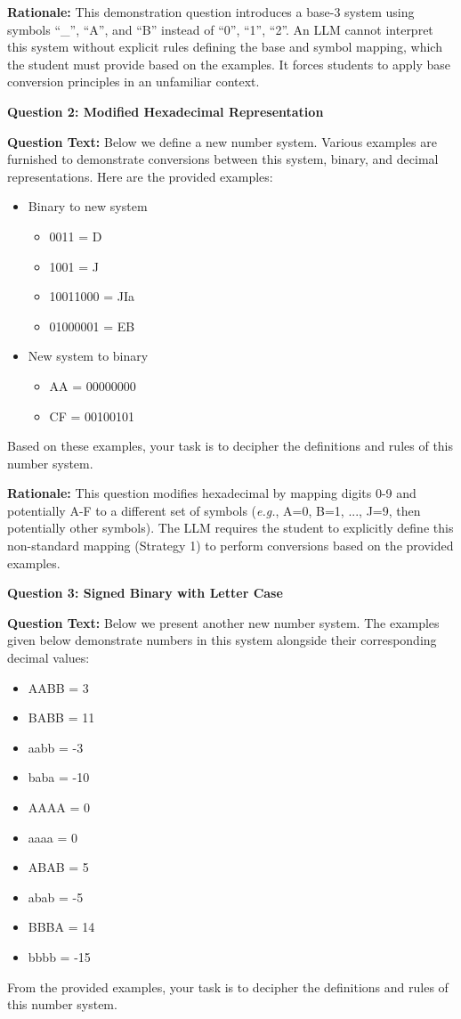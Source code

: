 \documentclass{article} %
\begin{document}
\textbf{Rationale:} This demonstration question introduces a base-3 system using symbols ``\_'', ``A'', and ``B'' instead of ``0'', ``1'', ``2''. An LLM cannot interpret this system without explicit rules defining the base and symbol mapping, which the student must provide based on the examples. It forces students to apply base conversion principles in an unfamiliar context.

\textbf{Question 2: Modified Hexadecimal Representation}

\textbf{Question Text:} Below we define a new number system. Various examples are furnished to demonstrate conversions between this system, binary, and decimal representations. Here are the provided examples:
\begin{itemize}
    \item Binary to new system
    \begin{itemize}
        \item 0011 = D
        \item 1001 = J
        \item 10011000 = JIa
        \item 01000001 = EB
    \end{itemize}
    \item New system to binary
    \begin{itemize}
        \item AA = 00000000
        \item CF = 00100101
    \end{itemize}
\end{itemize}
Based on these examples, your task is to decipher the definitions and rules of this number system.

\textbf{Rationale:} This question modifies hexadecimal by mapping digits 0-9 and potentially A-F to a different set of symbols ({\em e.g.}, A=0, B=1, ..., J=9, then potentially other symbols). The LLM requires the student to explicitly define this non-standard mapping (Strategy 1) to perform conversions based on the provided examples.

\textbf{Question 3: Signed Binary with Letter Case}

\textbf{Question Text:} Below we present another new number system. The examples given below demonstrate numbers in this system alongside their corresponding decimal values:
\begin{itemize}
    \item AABB = 3
    \item BABB = 11
    \item aabb = -3
    \item baba = -10
    \item AAAA = 0
    \item aaaa = 0
    \item ABAB = 5
    \item abab = -5
    \item BBBA = 14
    \item bbbb = -15
\end{itemize}
From the provided examples, your task is to decipher the definitions and rules of this number system.
\end{document}
